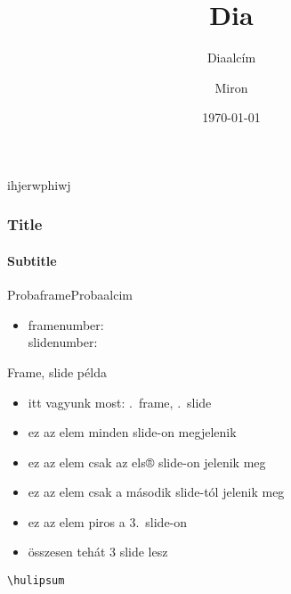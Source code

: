 \documentclass[aspectratio=169, 12pt, xcolor={table}]{beamer}
\author{Miron}
\title{Dia}
\subtitle{Diaalcím}
\institute{Miskolci egyetem}
\date{\today}
\begin{document}
ihjerwphiwj

\begin{frame}
\maketitle
\end{frame}

\begin{frame}
\frametitle{Title}
\framesubtitle{Subtitle}
\hulipsum[1]
\end{frame}

\begin{frame}{Probaframe}{Probaalcim}
\begin{itemize}
\item framenumber: \insertframenumber \\ 
slidenumber: \insertslidenumber
\end{itemize}
\end{frame}

\begin{frame}{Frame, slide példa}
\begin{itemize}
\item itt vagyunk most: \insertframenumber.\ frame,
\insertslidenumber.\ slide
\item ez az elem minden slide-on megjelenik
\item<1> ez az elem csak az els® slide-on
jelenik meg
\item<2-> ez az elem csak a második slide-tól
jelenik meg
\item \alert<3>{ez az elem piros a 3.\ slide-on}
\item összesen tehát 3 slide lesz
\end{itemize}
\end{frame}

\begin{frame}[fragile]
\begin{verbatim}
\hulipsum
\end{verbatim}
\end{frame}

\begin{frame}[allowframebreaks]
\hulipsum
\end{frame}
\end{document}
